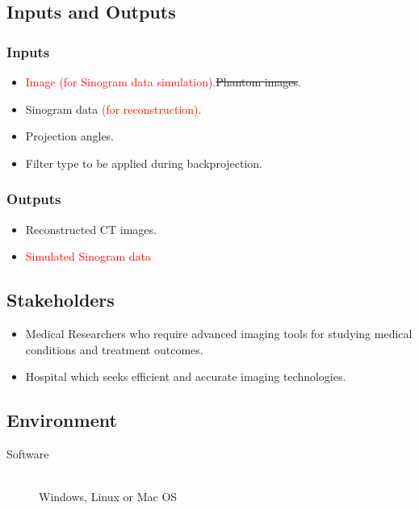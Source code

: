 \documentclass{article}
\newcommand{\add}{\textcolor{red}}
\begin{document}
\subsection{Inputs and Outputs}
\subsubsection{Inputs}
\begin{itemize}
\item \add{Image (for Sinogram data simulation).}\st{Phantom images}.
\item Sinogram data \add{(for reconstruction).}
\item Projection angles.
\item Filter type to be applied during backprojection.
\end{itemize}

\subsubsection{Outputs}
\begin{itemize}
  \item Reconstructed CT images.
  \item \add{Simulated Sinogram data}
\end{itemize}

\subsection{Stakeholders}
\begin{itemize}
\item Medical Researchers who require advanced imaging tools for studying
  medical conditions and treatment outcomes.
\item Hospital which seeks efficient and accurate imaging technologies.
\end{itemize}

\subsection{Environment}
\begin{description}
\item[Software] \hfill \\ Windows, Linux or Mac OS
\end{description}
\end{document}
